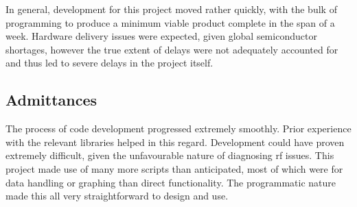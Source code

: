 In general, development for this project moved rather quickly, with the bulk of programming to produce 
a minimum viable product complete in the span of a week. Hardware delivery issues were expected, given 
global semiconductor shortages, however the true extent of delays were not adequately accounted for and 
thus led to severe delays in the project itself. 


\subsection{Admittances}
The process of code development progressed extremely smoothly. 
Prior experience with the relevant libraries helped in this regard.
Development could have proven extremely difficult, given the 
unfavourable nature of diagnosing \acrshort{rf} issues. 
This project made use of many more scripts than anticipated, 
most of which were for data handling or graphing than direct functionality. 
The programmatic nature made this all very straightforward to design and use. 



